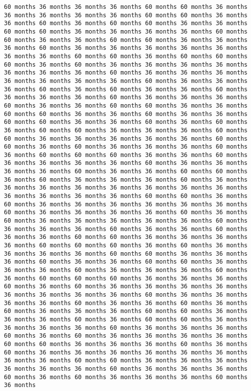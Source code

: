 \documentclass[11pt]{article}
\begin{document}
\begin{Verbatim}[commandchars=\\\{\}, frame=single, framerule=2mm, rulecolor=\color{outerrorbackground}]
60 months 36 months 36 months 36 months 60 months 60 months 36 months 36 months 36 months 36 months 36 months 60 months 60 months 36 months 36 months 60 months 36 months 60 months 60 months 36 months 36 months 60 months 60 months 36 months 36 months 36 months 36 months 60 months 60 months 36 months 36 months 60 months 60 months 36 months 36 months 36 months 60 months 36 months 36 months 36 months 36 months 36 months 36 months 36 months 60 months 60 months 36 months 60 months 60 months 60 months 36 months 60 months 36 months 36 months 36 months 36 months 36 months 36 months 36 months 60 months 36 months 36 months 36 months 36 months 36 months 36 months 36 months 60 months 36 months 36 months 36 months 60 months 36 months 60 months 36 months 36 months 60 months 36 months 36 months 36 months 60 months 36 months 36 months 36 months 60 months 36 months 36 months 60 months 60 months 36 months 36 months 60 months 60 months 36 months 36 months 60 months 36 months 36 months 60 months 60 months 36 months 36 months 60 months 36 months 60 months 36 months 60 months 60 months 36 months 36 months 36 months 60 months 60 months 36 months 36 months 36 months 36 months 36 months 60 months 60 months 36 months 60 months 36 months 36 months 36 months 60 months 36 months 60 months 60 months 60 months 36 months 36 months 60 months 36 months 36 months 36 months 36 months 60 months 36 months 36 months 36 months 36 months 60 months 36 months 36 months 60 months 60 months 36 months 60 months 36 months 36 months 36 months 60 months 36 months 36 months 36 months 36 months 36 months 36 months 36 months 36 months 36 months 36 months 36 months 36 months 60 months 60 months 36 months 60 months 36 months 36 months 36 months 36 months 36 months 36 months 60 months 36 months 36 months 36 months 36 months 60 months 36 months 60 months 36 months 36 months 36 months 36 months 36 months 60 months 36 months 36 months 36 months 60 months 36 months 36 months 60 months 36 months 36 months 60 months 60 months 36 months 36 months 36 months 36 months 60 months 60 months 60 months 36 months 60 months 36 months 36 months 36 months 36 months 60 months 60 months 36 months 36 months 36 months 60 months 36 months 36 months 60 months 60 months 36 months 36 months 36 months 60 months 36 months 36 months 36 months 60 months 36 months 60 months 60 months 60 months 36 months 36 months 36 months 60 months 36 months 60 months 36 months 36 months 36 months 36 months 36 months 36 months 36 months 36 months 60 months 36 months 36 months 36 months 36 months 60 months 36 months 36 months 60 months 36 months 60 months 36 months 36 months 36 months 60 months 60 months 36 months 36 months 36 months 60 months 36 months 60 months 60 months 36 months 36 months 36 months 36 months 60 months 36 months 36 months 36 months 60 months 36 months 60 months 36 months 36 months 36 months 36 months 60 months 60 months 36 months 36 months 36 months 60 months 36 months 60 months 36 months 36 months 36 months 36 months 36 months 36 months 36 months 36 months 60 months 60 months 36 months 36 months 36 months 36 months 36 months 36 months 60 months 36 months 36 months 36 months 60 months 36 months 60 months 36 months 36 months 36 months 60 months 36 months 
\end{Verbatim}
\end{document}
